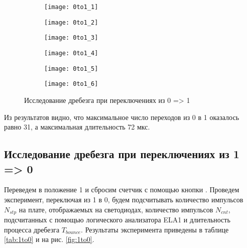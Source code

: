 \begin{figure}[H]
	\centering
	\begin{subfigure}[b]{\textwidth}
		\centering
		\texttt{[image: 0to1\_1]}
		\vspace{0.2cm}
	\end{subfigure}
	\begin{subfigure}[b]{\textwidth}
		\centering
		\texttt{[image: 0to1\_2]}
		\vspace{0.2cm}
	\end{subfigure}
	\begin{subfigure}[b]{\textwidth}
		\centering
		\texttt{[image: 0to1\_3]}
		\vspace{0.2cm}
	\end{subfigure}
	\begin{subfigure}[b]{\textwidth}
		\centering
		\texttt{[image: 0to1\_4]}
		\vspace{0.2cm}
	\end{subfigure}
	\begin{subfigure}[b]{\textwidth}
		\centering
		\texttt{[image: 0to1\_5]}
		\vspace{0.2cm}
	\end{subfigure}
	\begin{subfigure}[b]{\textwidth}
		\centering
		\texttt{[image: 0to1\_6]}
		\vspace{0.2cm}
	\end{subfigure}
	\caption{Исследование дребезга при переключениях из 0 => 1}
	\label{fig:0to1}
\end{figure}

Из результатов видно, что максимальное число переходов из 0 в 1 оказалось равно 31, а максимальная длительность 72 мкс.

\subsection{Исследование дребезга при переключениях из 1 => 0}

Переведем  в положение 1 и сбросим счетчик с помощью кнопки . Проведем эксперимент, переключая  из 1 в 0, будем подсчитывать количество импульсов $N_{stp}$ на плате, отображаемых на светодиодах, количество импульсов $N_{cnt}$, подсчитанных с помощью логического анализатора ELA1 и длительность процесса дребезга $T_{bounce}$. Результаты эксперимента приведены в таблице \ref{tab:1to0} и на рис. \ref{fig:1to0}.


